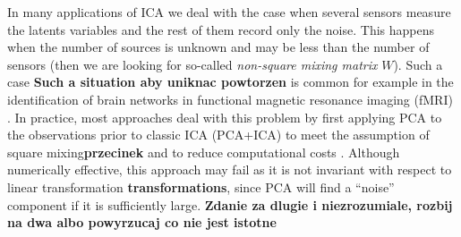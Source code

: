 In many applications of ICA we deal with the case when several sensors measure the latents variables and the rest of them record only the noise. This happens when the number of sources is unknown and may be less than the number of sensors (then we are looking for so-called {\em non-square mixing matrix} $W$).
Such a case \textbf{Such a situation aby uniknac powtorzen} is common for example in the identification of brain networks
in functional  magnetic resonance imaging (fMRI) 
\cite{beckmann2012modelling,green2002pca}.
In practice, most approaches deal with this problem by first applying PCA to the observations prior to classic ICA (PCA+ICA) to meet the assumption of square mixing\textbf{przecinek} and to reduce computational costs \cite{hyvarinen2004independent}. Although numerically effective, this approach may fail as it is not invariant with respect to linear transformation \textbf{transformations}, since PCA will find a ``noise'' component if
it is sufficiently large. \textbf{Zdanie za dlugie i niezrozumiale, rozbij na dwa albo powyrzucaj co nie jest istotne}

